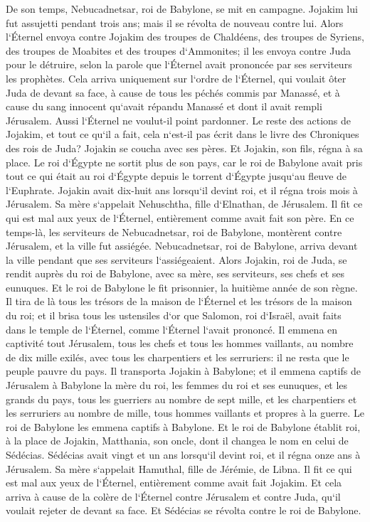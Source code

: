 \verse De son temps, Nebucadnetsar, roi de Babylone, se mit en campagne. Jojakim lui fut assujetti pendant trois ans; mais il se révolta de nouveau contre lui. 
\verse Alors l`Éternel envoya contre Jojakim des troupes de Chaldéens, des troupes de Syriens, des troupes de Moabites et des troupes d`Ammonites; il les envoya contre Juda pour le détruire, selon la parole que l`Éternel avait prononcée par ses serviteurs les prophètes. 
\verse Cela arriva uniquement sur l`ordre de l`Éternel, qui voulait ôter Juda de devant sa face, à cause de tous les péchés commis par Manassé, 
\verse et à cause du sang innocent qu`avait répandu Manassé et dont il avait rempli Jérusalem. Aussi l`Éternel ne voulut-il point pardonner. 
\verse Le reste des actions de Jojakim, et tout ce qu`il a fait, cela n`est-il pas écrit dans le livre des Chroniques des rois de Juda? 
\verse Jojakin se coucha avec ses pères. Et Jojakin, son fils, régna à sa place. 
\verse Le roi d`Égypte ne sortit plus de son pays, car le roi de Babylone avait pris tout ce qui était au roi d`Égypte depuis le torrent d`Égypte jusqu`au fleuve de l`Euphrate. 
\verse Jojakin avait dix-huit ans lorsqu`il devint roi, et il régna trois mois à Jérusalem. Sa mère s`appelait Nehuschtha, fille d`Elnathan, de Jérusalem. 
\verse Il fit ce qui est mal aux yeux de l`Éternel, entièrement comme avait fait son père. 
\verse En ce temps-là, les serviteurs de Nebucadnetsar, roi de Babylone, montèrent contre Jérusalem, et la ville fut assiégée. 
\verse Nebucadnetsar, roi de Babylone, arriva devant la ville pendant que ses serviteurs l`assiégeaient. 
\verse Alors Jojakin, roi de Juda, se rendit auprès du roi de Babylone, avec sa mère, ses serviteurs, ses chefs et ses eunuques. Et le roi de Babylone le fit prisonnier, la huitième année de son règne. 
\verse Il tira de là tous les trésors de la maison de l`Éternel et les trésors de la maison du roi; et il brisa tous les ustensiles d`or que Salomon, roi d`Israël, avait faits dans le temple de l`Éternel, comme l`Éternel l`avait prononcé. 
\verse Il emmena en captivité tout Jérusalem, tous les chefs et tous les hommes vaillants, au nombre de dix mille exilés, avec tous les charpentiers et les serruriers: il ne resta que le peuple pauvre du pays. 
\verse Il transporta Jojakin à Babylone; et il emmena captifs de Jérusalem à Babylone la mère du roi, les femmes du roi et ses eunuques, et les grands du pays, 
\verse tous les guerriers au nombre de sept mille, et les charpentiers et les serruriers au nombre de mille, tous hommes vaillants et propres à la guerre. Le roi de Babylone les emmena captifs à Babylone. 
\verse Et le roi de Babylone établit roi, à la place de Jojakin, Matthania, son oncle, dont il changea le nom en celui de Sédécias. 
\verse Sédécias avait vingt et un ans lorsqu`il devint roi, et il régna onze ans à Jérusalem. Sa mère s`appelait Hamuthal, fille de Jérémie, de Libna. 
\verse Il fit ce qui est mal aux yeux de l`Éternel, entièrement comme avait fait Jojakim. 
\verse Et cela arriva à cause de la colère de l`Éternel contre Jérusalem et contre Juda, qu`il voulait rejeter de devant sa face. Et Sédécias se révolta contre le roi de Babylone. 

